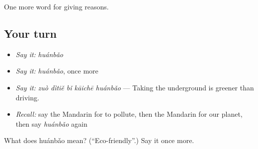 \begin{grammarlens}[title={What you've built}]
One more word for giving reasons.
\end{grammarlens}

\subsection*{Your turn}
\begin{itemize}
\raggedright
  \item \emph{Say it:} \emph{huánbǎo}
  \item \emph{Say it:} \emph{huánbǎo}, once more
  \item \emph{Say it:} \emph{zuò dìtiě bǐ kāichē huánbǎo} — Taking the underground is greener than driving.
  \item \emph{Recall:} say the Mandarin for to pollute, then the Mandarin for our planet, then say \emph{huánbǎo} again
\end{itemize}

\begin{tcolorbox}[breakable,colback=teal!4,colframe=teal!35!black,title={Before you move on}]
What does huánbǎo mean? (\textquotedblleft{}Eco-friendly\textquotedblright{}.) Say it once more.
\end{tcolorbox}
